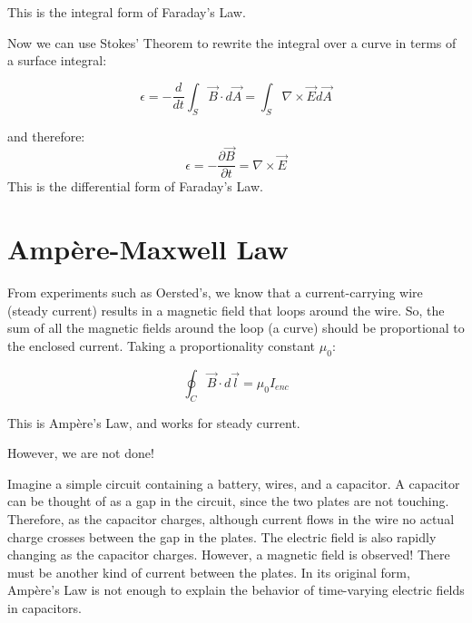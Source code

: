 \documentclass{article}
\begin{document}
\vspace{1em}
This is the integral form of Faraday's Law.

Now we can use Stokes' Theorem to rewrite the integral over a curve in terms of a surface integral:

\begin{equation}
\epsilon = -\frac{d}{dt}\int_S \vec B \cdot d \vec A = \int_S \nabla \times \vec E d\vec A
\end{equation}

and therefore:
\begin{equation}
\boxed{\epsilon = -\frac{\partial \vec B}{\partial t} = \nabla \times \vec E}
\end{equation}
This is the differential form of Faraday's Law.

\pagebreak
\section{Ampère-Maxwell Law}

From experiments such as Oersted's, we know that a current-carrying wire (steady current) results in a magnetic field that loops around the wire. So, the sum of all the magnetic fields around the loop (a curve) should be proportional to the enclosed current. Taking a proportionality constant $\mu_0$:

\begin{equation}
\oint_C \vec B \cdot d\vec l = \mu_0 I_{enc}
\end{equation}

This is Ampère's Law, and works for steady current. 

However, we are not done!

\vspace{1em}
Imagine a simple circuit containing a battery, wires, and a capacitor. A capacitor can be thought of as a gap in the circuit, since the two plates are not touching. Therefore, as the capacitor charges, although current flows in the wire no actual charge crosses between the gap in the plates. The electric field is also rapidly changing as the capacitor charges. However, a magnetic field is observed! There must be another kind of current between the plates. In its original form, Ampère’s Law is not enough to explain the behavior of time-varying electric fields in capacitors.
\end{document}
